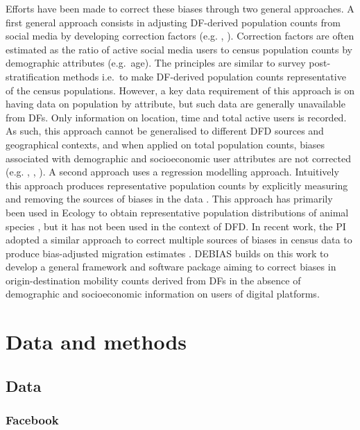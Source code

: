 \documentclass[]{rsos}%
\begin{document}
Efforts have been made to correct these biases through two general approaches. A first general approach consists in adjusting DF-derived population counts from social media by developing correction factors (e.g. \citep{yildiz17-twitter}, \citep{Hsiao24-bias}). Correction factors are often estimated as the ratio of active social media users to census population counts by demographic attributes (e.g.~age). The principles are similar to survey post-stratification methods i.e.~to make DF-derived population counts representative of the census populations. However, a key data requirement of this approach is on having data on population by attribute, but such data are generally unavailable from DFs. Only information on location, time and total active users is recorded. As such, this approach cannot be generalised to different DFD sources and geographical contexts, and when applied on total population counts, biases associated with demographic and socioeconomic user attributes are not corrected (e.g. \citep{rodriguez-carrion18-biases}, \citep{schlosser21-biases}, \citep{pak22-correcting-bias}). A second approach uses a regression modelling approach. Intuitively this approach produces representative population counts by explicitly measuring and removing the sources of biases in the data \citep{kramer-schadt13-bias-correction}. This approach has primarily been used in Ecology to obtain representative population distributions of animal species \citep{zizka21-sampbias}, but it has not been used in the context of DFD. In recent work, the PI adopted a similar approach to correct multiple sources of biases in census data to produce bias-adjusted migration estimates \citep{aparicio-castro23-bayesian}. DEBIAS builds on this work to develop a general framework and software package aiming to correct biases in origin-destination mobility counts derived from DFs in the absence of demographic and socioeconomic information on users of digital platforms.

\section{Data and methods}\label{data-and-methods}

\subsection{Data}\label{data}

\subsubsection{Facebook}\label{facebook}
\end{document}
